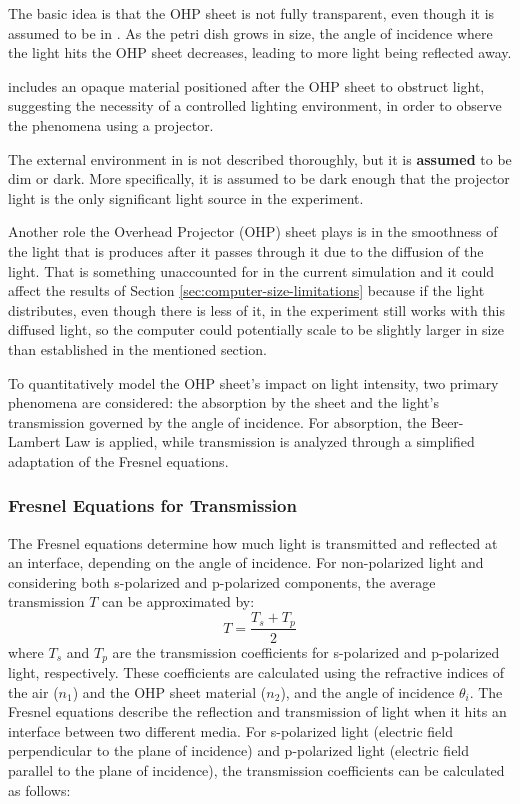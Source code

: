The basic idea is that the OHP sheet is not fully transparent, even though it is assumed to be in \cite{gorecki2003chemical}.
As the petri dish grows in size, the angle of incidence where the light hits the OHP sheet decreases, leading to more light being reflected away.

\cite{gorecki2003chemical} includes an opaque material positioned after the OHP sheet to obstruct light, suggesting the necessity of a controlled lighting environment, in order to observe the phenomena using a projector.
\begin{tcolorbox}[colback=red!5!white,colframe=blue!75!black,title=Assumptions for Lighting Environment]
The external environment in \cite{gorecki2003chemical} is not described thoroughly, but it is \textbf{assumed} to be dim or dark.
More specifically, it is assumed to be dark enough that the projector light is the only significant light source in the experiment. 
\end{tcolorbox}

Another role the Overhead Projector (OHP) sheet plays is in the smoothness of the light that is produces after it passes through it due to 
the diffusion of the light. That is something unaccounted for in the current simulation and it could affect the results of Section \ref{sec:computer-size-limitations}
because if the light distributes, even though there is less of it, in \cite{gorecki2003chemical} the experiment still works with this diffused light, so 
the computer could potentially scale to be slightly larger in size than established in the mentioned section.


To quantitatively model the OHP sheet's impact on light intensity, two primary phenomena are considered: the absorption by the sheet and the light's transmission governed by the angle of incidence. For absorption, the Beer-Lambert Law is applied, while transmission is analyzed through a simplified adaptation of the Fresnel equations.

\subsubsection*{Fresnel Equations for Transmission}
The Fresnel equations \citep{eschede2017optics} determine how much light is transmitted and reflected at an interface, depending on the angle of incidence. For non-polarized light and considering both s-polarized and p-polarized components, the average transmission \(T\) can be approximated by:
\[ T = \frac{T_s + T_p}{2} \]
where \(T_s\) and \(T_p\) are the transmission coefficients for s-polarized and p-polarized light, respectively. These coefficients are calculated using the refractive indices of the air (\(n_1\)) and the OHP sheet material (\(n_2\)), and the angle of incidence \(\theta_i\).
The Fresnel equations describe the reflection and transmission of light when it hits an interface between two different media. For s-polarized light (electric field perpendicular to the plane of incidence) and p-polarized light (electric field parallel to the plane of incidence), the transmission coefficients can be calculated as follows:

